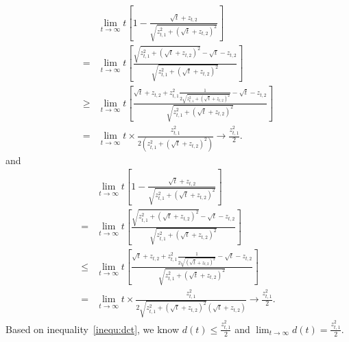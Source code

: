 \begin{align}
&\lim_{t\rightarrow\infty} t\left[1-\frac{\sqrt{t}+z_{t,2}}{\sqrt{z_{t,1}^2+(\sqrt{t}+z_{t,2})^2}}\right] \nonumber \\
=& \lim_{t\rightarrow\infty} t\left[\frac{\sqrt{z_{t,1}^2+(\sqrt{t}+z_{t,2})^2}-\sqrt{t}-z_{t,2}}{\sqrt{z_{t,1}^2+(\sqrt{t}+z_{t,2})^2}}\right]  \nonumber \\
\geq & \lim_{t\rightarrow\infty} t\left[\frac{\sqrt{t}+z_{t,2}+z_{t,1}^{2}\frac{1}{2\sqrt{z_{t,1}^2+(\sqrt{t}+z_{t,2})^2}}-\sqrt{t}-z_{t,2}}{\sqrt{z_{t,1}^2+(\sqrt{t}+z_{t,2})^2}}\right]  \nonumber \\
= & \lim_{t\rightarrow\infty} t \times \frac{z_{t,1}^2}{2(z_{t,1}^2+(\sqrt{t}+z_{t,2})^2)} \rightarrow \frac{z_{t,1}^2}{2}. \nonumber 
\end{align}
and
\begin{align}
&\lim_{t\rightarrow\infty} t\left[1-\frac{\sqrt{t}+z_{t,2}}{\sqrt{z_{t,1}^2+(\sqrt{t}+z_{t,2})^2}}\right] \nonumber \\
=& \lim_{t\rightarrow\infty} t\left[\frac{\sqrt{z_{t,1}^2+(\sqrt{t}+z_{t,2})^2}-\sqrt{t}-z_{t,2}}{\sqrt{z_{t,1}^2+(\sqrt{t}+z_{t,2})^2}}\right]  \nonumber \\
\leq & \lim_{t\rightarrow\infty} t\left[\frac{\sqrt{t}+z_{t,2}+z_{t,1}^{2}\frac{1}{2\sqrt{(\sqrt{t}+z_{t,2})^2}}-\sqrt{t}-z_{t,2}}{\sqrt{z_{t,1}^2+(\sqrt{t}+z_{t,2})^2}}\right]  \nonumber \\
= & \lim_{t\rightarrow\infty} t \times \frac{z_{t,1}^2}{2\sqrt{z_{t,1}^2+(\sqrt{t}+z_{t,2})^2}(\sqrt{t}+z_{t,2})} \rightarrow \frac{z_{t,1}^2}{2}. \label{inequ:dct}
\end{align}   
Based on inequality~\eqref{inequ:dct}, we know $d(t)\leq \frac{z_{t,1}^{2}}{2}$ and $\lim_{t\rightarrow\infty}d(t)=\frac{z_{t,1}^2}{2}$.


